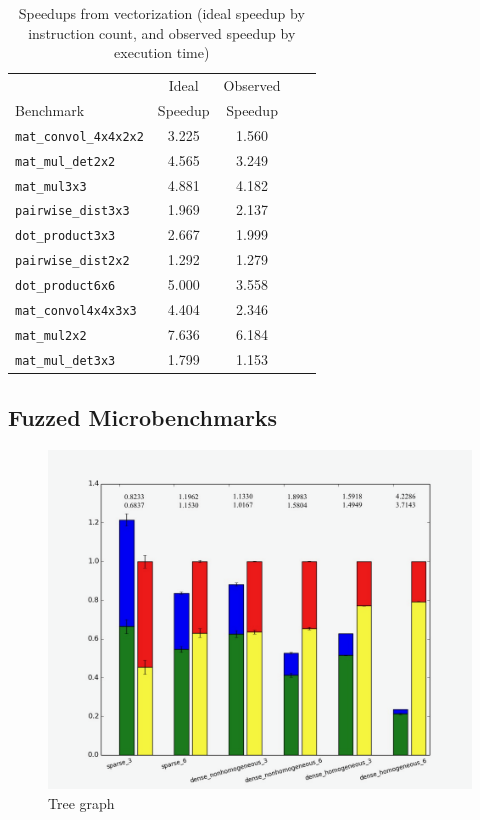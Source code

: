 \begin{table}
    \begin{tabular}{lcccc}
        \toprule    
         & Ideal & Observed\\
        Benchmark & Speedup & Speedup\\\midrule
        \texttt{mat\_convol\_4x4x2x2} & 3.225 & 1.560\\
        \texttt{mat\_mul\_det2x2} & 4.565 & 3.249\\
        \texttt{mat\_mul3x3} & 4.881 & 4.182\\
        \texttt{pairwise\_dist3x3} & 1.969 & 2.137\\
        \texttt{dot\_product3x3} & 2.667 & 1.999\\
        \texttt{pairwise\_dist2x2} & 1.292 & 1.279\\
        \texttt{dot\_product6x6} & 5.000 & 3.558\\
        \texttt{mat\_convol4x4x3x3} & 4.404 & 2.346\\
        \texttt{mat\_mul2x2} & 7.636 & 6.184\\
        \texttt{mat\_mul\_det3x3} & 1.799 & 1.153\\\bottomrule
    \end{tabular}
    \caption{Speedups from vectorization (ideal speedup by instruction count, and observed speedup by execution time)}\label{tab:ideal-speedup}
\end{table}


\subsection{Fuzzed Microbenchmarks}

\begin{figure}
    \includegraphics[width=0.9\columnwidth]{figures/graphs/TreeGraphwithNumbers.png}
    \caption{Tree graph}
\end{figure}
